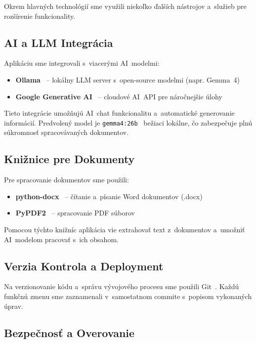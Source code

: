         Okrem hlavných technológií sme využili niekoľko ďalších nástrojov a~služieb
pre rozšírenie funkcionality.

\subsection{AI a LLM Integrácia}

        Aplikáciu sme integrovali s~viacerými AI~modelmi:

\begin{itemize}
  \item \textbf{Ollama}~\cite{ollama_github} -- lokálny LLM server s~open-source modelmi (napr. Gemma~4)
  \item \textbf{Google Generative AI}~\cite{google_genai} -- cloudové AI~API pre náročnejšie úlohy
\end{itemize}

        Tieto integrácie umožňujú AI~chat funkcionalitu a~automatické generovanie informácií.
Predvolený model je \texttt{gemma4:26b}~\cite{gemma4_google} bežiaci lokálne, čo zabezpečuje plnú súkromnosť
spracovávaných dokumentov.

\subsection{Knižnice pre Dokumenty}

        Pre spracovanie dokumentov sme použili:

\begin{itemize}
  \item \textbf{python-docx}~\cite{python_docx} -- čítanie a~písanie Word dokumentov (.docx)
  \item \textbf{PyPDF2}~\cite{pypdf2_docs} -- spracovanie PDF súborov
\end{itemize}

        Pomocou týchto knižníc aplikácia vie extrahovať text z~dokumentov a~umožniť
AI~modelom pracovať s~ich obsahom.

\subsection{Verzia Kontrola a Deployment}

        Na verzionovanie kódu a~správu vývojového procesu sme použili Git~\cite{git_scm}. Každú
funkčnú zmenu sme zaznamenali v~samostatnom commite s~popisom vykonaných úprav.

\subsection{Bezpečnosť a Overovanie}

